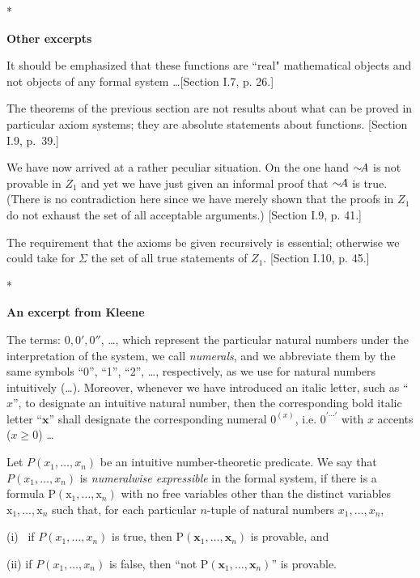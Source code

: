 \documentclass[12pt]{article}
\begin{document}
\centerline{*}%

\centerline{\textbf{Other excerpts}}

It should be emphasized that these functions are ``real" mathematical objects and not objects of any formal system \dots [Section I.7, p. 26.] 

The theorems of the previous section are not results about what can be proved in particular axiom systems; they are absolute statements about functions. [Section I.9, p.~39.] 

We have now arrived at a rather peculiar situation. On the one hand $\sim\kern-1ex A$ is not provable in $Z_1$ and yet we have just given an informal proof that $\sim\kern-1ex A$ is true. (There is no contradiction here since we have merely shown that the proofs in $Z_1$ do not exhaust the set of all acceptable arguments.) [Section I.9, p. 41.] 

The requirement that the axioms be given recursively is essential; otherwise we could take for $\Sigma$ the set of all true statements of $Z_1$. [Section I.10, p. 45.]\bigskip

\centerline{*}\bigskip

\centerline{\textbf{An excerpt from Kleene}}%

The terms: $0, 0', 0''$, \dots, which represent the particular natural numbers under the interpretation of the system, we call \textit{numerals}, and we abbreviate them by the same symbols ``0'',  ``1'',  ``2'', \dots, respectively, as we use for natural numbers intuitively (\dots). Moreover, whenever we have introduced an italic letter, such as ``$x$'', to designate an intuitive natural number, then the corresponding bold italic letter ``$\pmb{x}$'' shall designate the corresponding 
numeral $0^{(x)}$, i.e. $0^{'\cdots'}$ with $x$ accents ($x\ge0$) \dots\smallskip

Let $P(x_1,\dots,x_n)$ be an intuitive number-theoretic predicate. We say that $P(x_1,\dots,x_n)$ is \textit{numeralwise expressible} in the formal system, if there is a formula $\mbox{P}(\mbox{x}_1,\dots,\mbox{x}_n)$ with no free variables other than the distinct variables $\mbox{x}_1,\dots,\mbox{x}_n$ such that, for each particular $n$-tuple of natural numbers $x_1,\dots,x_n$, \smallskip

(i) \ if $P(x_1,\dots,x_n)$ is true, then $\mbox{P}(\pmb{x}_1,\dots,\pmb{x}_n)$ is provable, and \smallskip

(ii) if $P(x_1,\dots,x_n)$ is false, then ``not $\mbox{P}(\pmb{x}_1,\dots,\pmb{x}_n)$'' is provable. 
\end{document}
